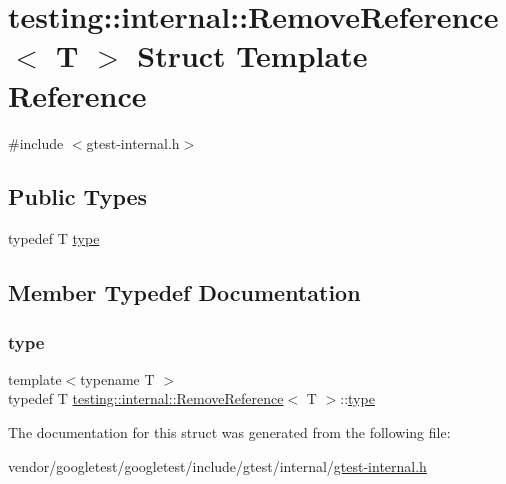 \hypertarget{structtesting_1_1internal_1_1_remove_reference}{}\section{testing\+:\+:internal\+:\+:Remove\+Reference$<$ T $>$ Struct Template Reference}
\label{structtesting_1_1internal_1_1_remove_reference}


{\ttfamily \#include $<$gtest-\/internal.\+h$>$}

\subsection*{Public Types}
\begin{DoxyCompactItemize}
\item 
typedef T \hyperlink{structtesting_1_1internal_1_1_remove_reference_a9ca4f6499579225f7986b789ee4b2895}{type}
\end{DoxyCompactItemize}


\subsection{Member Typedef Documentation}
\mbox{\label{structtesting_1_1internal_1_1_remove_reference_a9ca4f6499579225f7986b789ee4b2895}} 
\subsubsection{\texorpdfstring{type}{type}}
{\footnotesize\ttfamily template$<$typename T $>$ \\
typedef T \hyperlink{structtesting_1_1internal_1_1_remove_reference}{testing\+::internal\+::\+Remove\+Reference}$<$ T $>$\+::\hyperlink{structtesting_1_1internal_1_1_remove_reference_a9ca4f6499579225f7986b789ee4b2895}{type}}



The documentation for this struct was generated from the following file\+:\begin{DoxyCompactItemize}
\item 
vendor/googletest/googletest/include/gtest/internal/\hyperlink{gtest-internal_8h}{gtest-\/internal.\+h}\end{DoxyCompactItemize}
